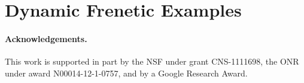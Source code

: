 \documentclass{article}
\begin{document}
\section{Dynamic Frenetic Examples}

\paragraph*{Acknowledgements.}
%
This work is supported in part by the NSF under grant
CNS-1111698, the ONR under award N00014-12-1-0757, and by a Google
Research Award.

{

}
\end{document}
